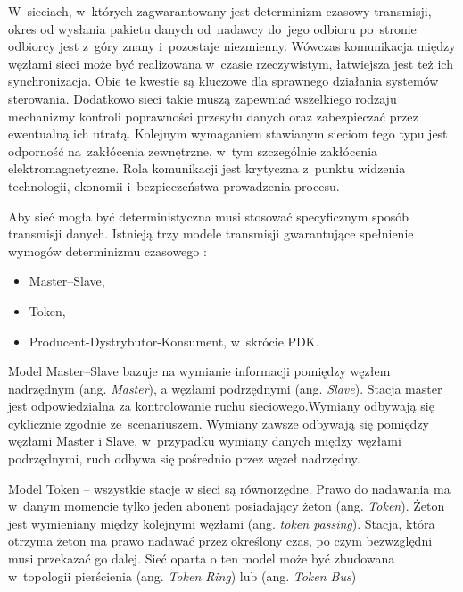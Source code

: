 W~sieciach, w~których zagwarantowany jest determinizm czasowy transmisji, okres od wysłania pakietu danych od~nadawcy do~jego odbioru po~stronie odbiorcy jest z~góry znany i~pozostaje niezmienny. Wówczas komunikacja między węzłami sieci może być realizowana w~czasie rzeczywistym, łatwiejsza jest też ich synchronizacja. Obie te kwestie są kluczowe dla sprawnego działania systemów sterowania. Dodatkowo sieci takie muszą zapewniać wszelkiego rodzaju mechanizmy kontroli poprawności przesyłu danych oraz zabezpieczać przez ewentualną ich utratą. Kolejnym wymaganiem stawianym sieciom tego typu jest odporność na~zakłócenia zewnętrzne, w~tym szczególnie zakłócenia elektromagnetyczne. Rola komunikacji jest krytyczna z~punktu widzenia technologii, ekonomii i~bezpieczeństwa prowadzenia procesu. 

Aby sieć mogła być deterministyczna musi stosować specyficznym sposób transmisji danych.
Istnieją trzy modele transmisji gwarantujące spełnienie wymogów determinizmu czasowego \cite{kwiecien,gaj}:
\begin{itemize}
\item Master--Slave,
\item Token,
\item Producent-Dystrybutor-Konsument, w~skrócie PDK.
\end{itemize}

Model Master--Slave bazuje na wymianie informacji pomiędzy węzłem nadrzędnym (ang. \textit{Master}), a węzłami podrzędnymi (ang. \textit{Slave}). Stacja master jest odpowiedzialna za kontrolowanie ruchu sieciowego.Wymiany odbywają się cyklicznie zgodnie ze~scenariuszem. Wymiany zawsze odbywają się pomiędzy węzłami Master i Slave, w~przypadku wymiany danych między węzłami podrzędnymi, ruch odbywa się pośrednio przez węzeł nadrzędny.

Model Token -- wszystkie stacje w sieci są równorzędne. Prawo do nadawania ma w~danym momencie tylko jeden abonent posiadający żeton (ang. \textit{Token}). Żeton jest wymieniany między kolejnymi węzłami (ang. \textit{token passing}). Stacja, która otrzyma żeton ma prawo nadawać przez określony czas, po czym bezwzględni musi przekazać go dalej. Sieć oparta o ten model może być zbudowana w~topologii pierścienia (ang. \textit{Token Ring}) lub (ang. \textit{Token Bus})

